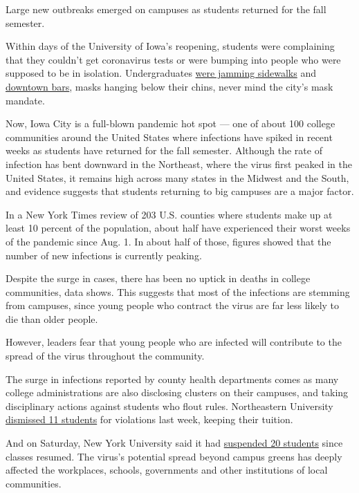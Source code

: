 Large new outbreaks emerged on campuses as students returned for the
fall semester.

Within days of the University of Iowa's reopening, students were
complaining that they couldn't get coronavirus tests or were bumping
into people who were supposed to be in isolation. Undergraduates
\href{https://twitter.com/VanessaMiller12/status/1297386480164364290/photo/1}{were
jamming sidewalks} and
\href{https://twitter.com/VanessaMiller12/status/1297392675700776960}{downtown
bars}, masks hanging below their chins, never mind the city's mask
mandate.

Now, Iowa City is a full-blown pandemic hot spot --- one of about 100
college communities around the United States where infections have
spiked in recent weeks as students have returned for the fall semester.
Although the rate of infection has bent downward in the Northeast, where
the virus first peaked in the United States, it remains high across many
states in the Midwest and the South, and evidence suggests that students
returning to big campuses are a major factor.

In a New York Times review of 203 U.S. counties where students make up
at least 10 percent of the population, about half have experienced their
worst weeks of the pandemic since Aug. 1. In about half of those,
figures showed that the number of new infections is currently peaking.

Despite the surge in cases, there has been no uptick in deaths in
college communities, data shows. This suggests that most of the
infections are stemming from campuses, since young people who contract
the virus are far less likely to die than older people.

However, leaders fear that young people who are infected will contribute
to the spread of the virus throughout the community.

The surge in infections reported by county health departments comes as
many college administrations are also disclosing clusters on their
campuses, and taking disciplinary actions against students who flout
rules. Northeastern University
\href{https://www.nytimes3xbfgragh.onion/2020/09/05/world/coronavirus-covid.html}{dismissed
11 students} for violations last week, keeping their tuition.

And on Saturday, New York University said it had
\href{https://twitter.com/nyuniversity/status/1302380699010433026}{suspended
20 students} since classes resumed. The virus's potential spread beyond
campus greens has deeply affected the workplaces, schools, governments
and other institutions of local communities.

